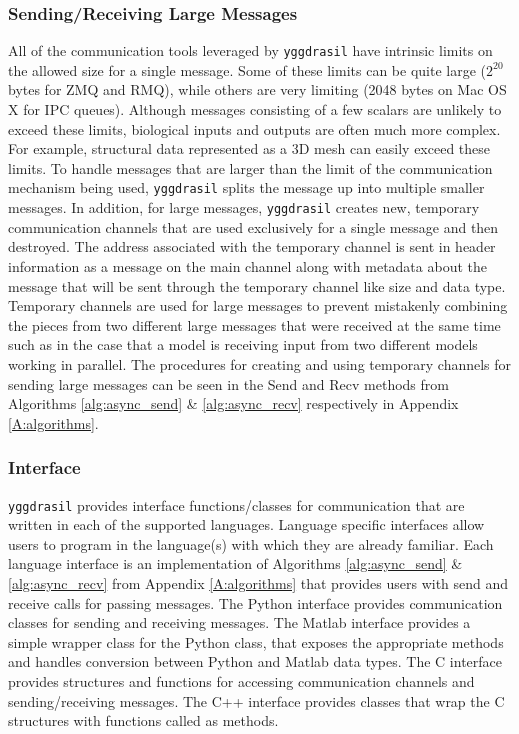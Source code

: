 \documentclass[journal]{IEEEtran}
\newcommand{\pkg}{{\tt yggdrasil}{}}
\newcommand{\A}{Appendix{ }}
\begin{document}
\subsubsection{Sending/Receiving Large Messages}\label{SSS:large}
%
All of the communication tools leveraged by {\pkg} have intrinsic limits on the allowed size for a single message. Some of these limits can be quite large ($2^{20}$ bytes for ZMQ and RMQ), while others are very limiting (2048 bytes on Mac OS X for IPC queues). Although messages consisting of a few scalars are unlikely to exceed these limits, biological inputs and outputs are often much more complex. For example, structural data represented as a 3D mesh can easily exceed these limits. To handle messages that are larger than the limit of the communication mechanism being used, {\pkg} splits the message up into multiple smaller messages. In addition, for large messages, {\pkg} creates new, temporary communication channels that are used exclusively for a single message and then destroyed. The address associated with the temporary channel is sent in header information as a message on the main channel along with metadata about the message that will be sent through the temporary channel like size and data type. Temporary channels are used for large messages to prevent mistakenly combining the pieces from two different large messages that were received at the same time such as in the case that a model is receiving input from two different models working in parallel. The procedures for creating and using temporary channels for sending large messages can be seen in the {\sc Send} and {\sc Recv} methods from Algorithms \ref{alg:async_send} \& \ref{alg:async_recv} respectively in \A\ref{A:algorithms}.


\subsubsection{Interface}\label{SSS:interface}
%
{\pkg} provides interface functions/classes for communication that are written in each of the supported languages. Language specific interfaces allow users to program in the language(s) with which they are already familiar.  Each language interface is an implementation of Algorithms \ref{alg:async_send} \& \ref{alg:async_recv} from \A\ref{A:algorithms} that provides users with send and receive calls for passing messages. The Python interface provides communication classes for sending and receiving messages. The Matlab interface provides a simple wrapper class for the Python class, that exposes the appropriate methods and handles conversion between Python and Matlab data types. The C interface provides structures and functions for accessing communication channels and sending/receiving messages. The C++ interface provides classes that wrap the C structures with functions called as methods.
\end{document}
